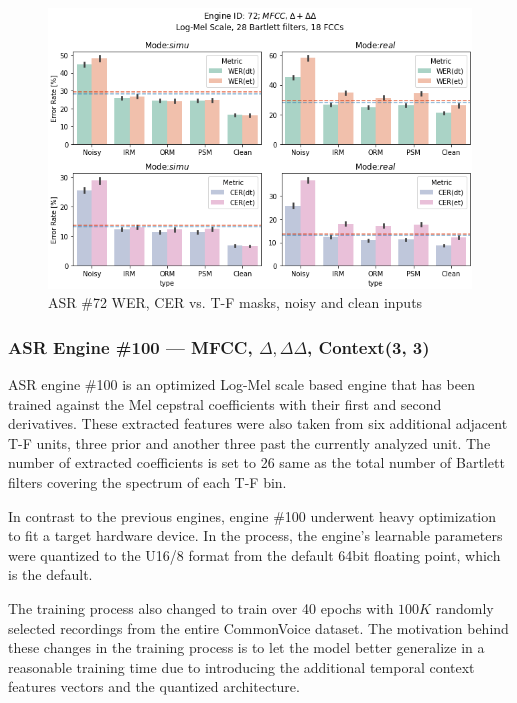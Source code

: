 \begin{figure}[H]
    \centering
    \includegraphics[width=0.95\linewidth]{ASR/images/asr72_wer_masks.png}
    \caption{ASR \#72 WER, CER vs. T-F masks, noisy and clean inputs }\label{fig:asr72_wer_masks}
\end{figure}

\subsubsection{ASR Engine \#100 --- MFCC, \(\Delta,\Delta\Delta\), Context(3, 3)}
ASR engine \#100 is an optimized Log-Mel scale based engine
that has been trained against the Mel cepstral coefficients
with their first and second derivatives. These extracted features
were also taken from six additional adjacent T-F units, three
prior and another three past the currently analyzed unit.
The number of extracted coefficients is set to 26 same as the
total number of Bartlett filters covering the spectrum of each T-F bin.

\bigskip

In contrast to the previous engines, engine \#100
underwent heavy optimization to fit a target hardware device.
In the process, the engine's learnable parameters were quantized
to the U16/8 format from the default 64bit floating point, which is the default.

\bigskip

The training process also changed to train over 40 epochs
with \(100K\) randomly selected recordings from the
entire CommonVoice dataset. The motivation behind
these changes in the training process is to let the model
better generalize in a reasonable training time due to
introducing the additional temporal context 
features vectors and the quantized architecture.


